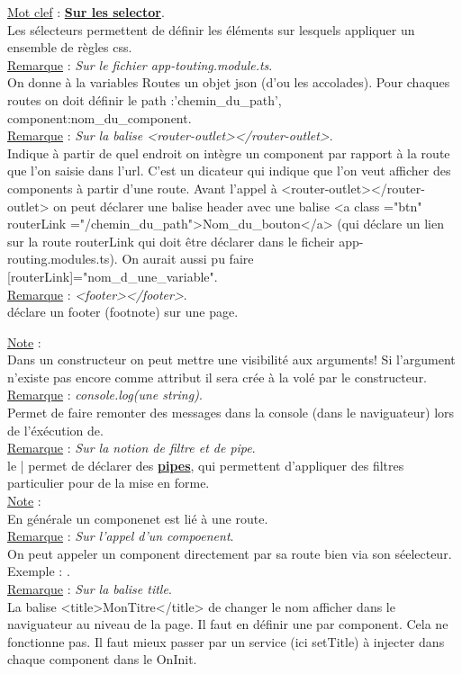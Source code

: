 \documentclass[a4paper,12pt,twoside]{article}
\newcommand{\urlcolor}{magenta}  %
\newcommand{\keycolor}{purple} %
\newcommand{\incode}[1]{{\footnotesize\ttfamily #1}} %
\newcommand{\rem}[2]{\noindent\underline{Remarque} : \textit{#1}.\\ \indent #2}
\newcommand{\note}[1]{\noindent\underline{Note} : \\ \indent #1}
\newcommand{\keyref}[2]{\hypersetup{urlcolor=\keycolor} \href{#1}{\textbf{#2}}\hypersetup{urlcolor=\urlcolor}}
\newcommand{\keyword}[3]{\noindent\underline{Mot clef} : \keyref{#1}{#2}. \\ \indent #3}
\begin{document}
\keyword{https://developer.mozilla.org/en-US/docs/Web/CSS/CSS_Selectors}{Sur les selector}{Les sélecteurs permettent de définir les éléments sur lesquels appliquer un ensemble de règles css.}\\

\rem{Sur le fichier app-touting.module.ts}{On donne à la variables Routes un objet json (d'ou les accolades). Pour chaques routes on doit définir le \incode{path :'chemin\_du\_path', component:nom\_du\_component}.}\\

\rem{Sur la balise <router-outlet></router-outlet>}{Indique à partir de quel endroit on intègre un component par rapport à la route que l'on saisie dans l'url. C'est un dicateur qui indique que l'on veut afficher des components à partir d'une route. Avant l'appel à <router-outlet></router-outlet> on peut déclarer une balise header avec une balise <a class ="btn" routerLink ="/chemin\_du\_path">Nom\_du\_bouton</a> (qui déclare un lien sur la route routerLink qui doit être déclarer dans le ficheir app-routing.modules.ts). On aurait aussi pu faire [routerLink]="nom_d_une_variable".}\\

\rem{<footer></footer>}{déclare un footer (footnote) sur une page.}

\note{Dans un constructeur on peut mettre une visibilité aux arguments! Si l'argument n'existe pas encore comme attribut il sera crée à la volé par le constructeur.}\\

\rem{console.log(une string)}{Permet de faire remonter des messages dans la console (dans le naviguateur) lors de l'éxécution de.}\\

\rem{Sur la notion de filtre et de pipe}{le | permet de déclarer des \keyref{https://angular.io/guide/pipes}{pipes}, qui permettent d'appliquer des filtres particulier pour de la mise en forme.}\\

\note{En générale un componenet est lié à une route.}\\

\rem{Sur l'appel d'un compoenent}{On peut appeler un component directement par sa route bien via son séelecteur. Exemple : \incde{<component\_name></component\_name>}.}\\

\rem{Sur la balise title}{La balise \incode{<title>MonTitre</title>} de changer le nom afficher dans le naviguateur au niveau de la page. Il faut en définir une par component. Cela ne fonctionne pas. Il faut mieux passer par un service (ici setTitle) à injecter dans chaque component dans le OnInit.}\\
\end{document}
